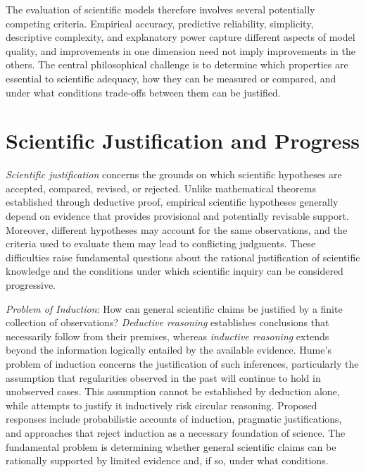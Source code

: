 The evaluation of scientific models therefore involves several potentially competing criteria. Empirical accuracy, predictive reliability, simplicity, descriptive complexity, and explanatory power capture different aspects of model quality, and improvements in one dimension need not imply improvements in the others. The central philosophical challenge is to determine which properties are essential to scientific adequacy, how they can be measured or compared, and under what conditions trade-offs between them can be justified.

%
%

\section{Scientific Justification and Progress}
\label{sec:scientific_justification}

\emph{Scientific justification} concerns the grounds on which scientific hypotheses are accepted, compared, revised, or rejected. Unlike mathematical theorems established through deductive proof, empirical scientific hypotheses generally depend on evidence that provides provisional and potentially revisable support. Moreover, different hypotheses may account for the same observations, and the criteria used to evaluate them may lead to conflicting judgments. These difficulties raise fundamental questions about the rational justification of scientific knowledge and the conditions under which scientific inquiry can be considered progressive.

\emph{Problem of Induction}: How can general scientific claims be justified by a finite collection of observations? \emph{Deductive reasoning} establishes conclusions that necessarily follow from their premises, whereas \emph{inductive reasoning} extends beyond the information logically entailed by the available evidence. Hume's problem of induction concerns the justification of such inferences, particularly the assumption that regularities observed in the past will continue to hold in unobserved cases. This assumption cannot be established by deduction alone, while attempts to justify it inductively risk circular reasoning. Proposed responses include probabilistic accounts of induction, pragmatic justifications, and approaches that reject induction as a necessary foundation of science. The fundamental problem is determining whether general scientific claims can be rationally supported by limited evidence and, if so, under what conditions.

